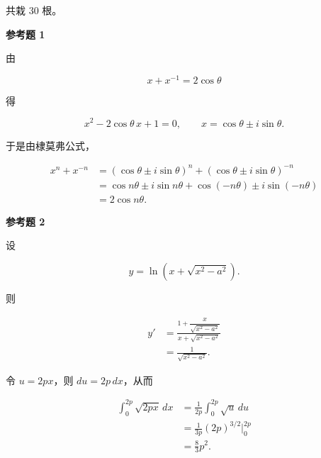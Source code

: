 \begin{answer}

共栽 $30$ 根。

\textbf{参考题 1}

由

\nopagebreak[4]
\[
x+x^{-1}=2\cos\theta
\]

得

\nopagebreak[4]
\[
x^2-2\cos\theta\,x+1=0,
\qquad
x=\cos\theta\pm i\sin\theta.
\]

于是由棣莫弗公式，

\nopagebreak[4]
\[
\begin{aligned}
x^n+x^{-n}
&=(\cos\theta\pm i\sin\theta)^n
+(\cos\theta\pm i\sin\theta)^{-n}\\
&=\cos n\theta\pm i\sin n\theta
+\cos(-n\theta)\pm i\sin(-n\theta)\\
&=2\cos n\theta.
\end{aligned}
\]

\textbf{参考题 2}


设

\nopagebreak[4]
\[
y=\ln\left(x+\sqrt{x^2-a^2}\right).
\]

则

\nopagebreak[4]
\[
\begin{aligned}
y'
&=\frac{1+\dfrac{x}{\sqrt{x^2-a^2}}}
{x+\sqrt{x^2-a^2}}\\
&=\frac1{\sqrt{x^2-a^2}}.
\end{aligned}
\]


令 $u=2px$，则 $du=2p\,dx$，从而

\nopagebreak[4]
\[
\begin{aligned}
\int_0^{2p}\sqrt{2px}\,dx
&=\frac1{2p}\int_0^{2p}\sqrt{u}\,du\\
&=\frac1{3p}(2p)^{3/2}\bigg|_0^{2p}\\
&=\frac83p^2.
\end{aligned}
\]



\end{answer}